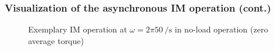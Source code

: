 \begin{frame}
	\frametitle{Visualization of the asynchronous IM operation (cont.)}
    \vspace{-0.275cm}
    \begin{figure}
        \centering
        \vspace{-0.25cm}
        \caption{Exemplary IM operation at $\omega=2 \pi \SI{50}{\per\second}$ in no-load operation (zero average torque)}
        \label{fig:Clarke_Park_animation}
    \end{figure}
\end{frame}

